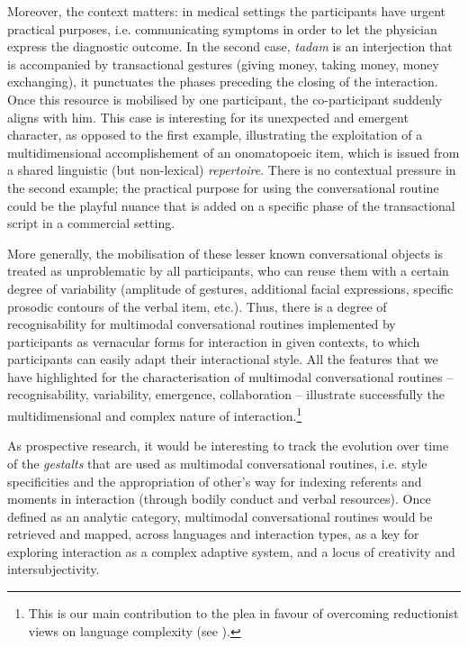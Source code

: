\documentclass[output=paper]{langscibook}
\begin{document}
Moreover, the context matters: in medical settings the participants have urgent practical purposes, i.e. communicating symptoms in order to let the physician express the diagnostic outcome. In the second case, \textit{tadam} is an interjection that is accompanied by transactional gestures (giving money, taking money, money exchanging), it punctuates the phases preceding the closing of the interaction. Once this resource is mobilised by one participant, the co-participant suddenly aligns with him. This case is interesting for its unexpected and emergent character, as opposed to the first example, illustrating the exploitation of a multidimensional accomplishement of an onomatopoeic item, which is issued from a shared linguistic (but non-lexical) \textit{repertoire}. There is no contextual pressure in the second example; the practical purpose for using the conversational routine could be the playful nuance that is added on a specific phase of the transactional script in a commercial setting.\largerpage

More generally, the mobilisation of these lesser known conversational objects is treated as unproblematic by all participants, who can reuse them with a certain degree of variability (amplitude of gestures, additional facial expressions, specific prosodic contours of the verbal item, etc.). Thus, there is a degree of recognisability for multimodal conversational routines implemented by participants as vernacular forms for interaction in given contexts, to which participants can easily adapt their interactional style. All the features that we have highlighted for the characterisation of multimodal conversational routines – recognisability, variability, emergence, collaboration – illustrate successfully the multidimensional and complex nature of interaction.\footnote{This is our main contribution to the plea in favour of overcoming reductionist views on language complexity (see ).}

As prospective research, it would be interesting to track the evolution over time of the \textit{gestalts} that are used as multimodal conversational routines, i.e. style specificities and the appropriation of other's way for indexing referents and moments in interaction (through bodily conduct and verbal resources). Once defined as an analytic category, multimodal conversational routines would be retrieved and mapped, across languages and interaction types, as a key for exploring interaction as a complex adaptive system, and a locus of creativity and intersubjectivity.
\end{document}
